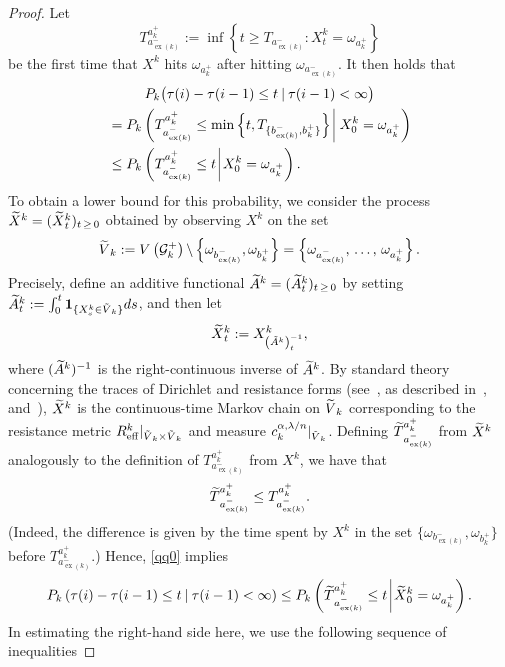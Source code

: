 \documentclass[AHL,Unicode,longabstracts,published]{cedram}
\newcommand{\clG}{\mathcal{G}}
\newcommand{\bfun}{\mathbf{1}}
\newcommand{\eff}{\mathrm{eff}}
\newcommand{\Pk}{{P_k}}
\newcommand\ex{\operatorname{ex}}
\newcommand{\aat}[1]{a_{\ex(#1)}^-}
\newcommand{\bt}[1]{b_{\ex(#1)}^-}
\let\oldtilde\tilde
\renewcommand*{\tilde}[1]{\mathchoice{\widetilde{#1}}{\widetilde{#1}}{\oldtilde{#1}}{\oldtilde{#1}}}
\begin{document}
\begin{proof}
Let
\[
T_{\aat{k}}^{a_k^+}:=\inf\left\{t\geq T_{\aat{k}}:X^k_t=\omega_{a_k^+}\right\}
\]
be the first time that $X^k$ hits $\omega_{a_k^+}$ after hitting $\omega_{\aat{k}}$. It then holds that
\begin{multline}\label{qq0}
{\Pk\big(\tau(i)-\tau(i-1)\leq t\:|\:\tau(i-1)<\infty\big)}
\\
\begin{aligned}
&=\Pk\left(T_{\aat{k}}^{a_k^+}\leq \min\left\{t,T_{\{\bt{k},b_k^+\}}\right\}\:\vline\:X^k_0=\omega_{a_k^+}\right)\\
&\leq \Pk\left(T_{\aat{k}}^{a_k^+}\leq t\:\vline\:X^k_0=\omega_{a_k^+}\right).
\end{aligned}
\end{multline}
To obtain a lower bound for this probability, we consider the process $\tilde{X}^k=(\tilde{X}^k_t)_{t\,\geq\,0}$ obtained by observing $X^k$ on the set
\[
\tilde{V}_k:=V\left(\clG_k^+\right)\backslash\left\{\omega_{\bt{k}},\omega_{b_k^+}\right\}=\left\{\omega_{\aat{k}},\,\dots,\,\omega_{a_k^+}\right\}.
\]
Precisely, define an additive functional $\tilde{A}^k=(\tilde{A}^k_t)_{t\,\geq\,0}$ by setting $\tilde{A}^k_t:=\int_0^t\bfun_{
\{X^k_s\in\tilde{V}_k\}}ds$, and then let
\begin{equation}\label{xtildekdef}
\tilde{X}^k_t:=X^k_{\left(\tilde{A}^k\right)^{-1}_t},
\end{equation}
where $(\tilde{A}^k)^{-1}$ is the right-continuous inverse of $\tilde{A}^k$. By standard theory concerning the traces of Dirichlet and resistance forms (see~\cite[Theorem~6.2.1]{FOT}, as described in~\cite[Theorem~4.17]{Barlow}, and~\cite[Theorem~8.4]{Kigami}), $\tilde{X}^k$ is the continuous-time Markov chain on $\tilde{V}_k$ corresponding to the resistance metric $R^k_{\eff}|_{\tilde{V}_k\times \tilde{V}_k}$ and measure $c_k^{\alpha,\lambda/n}|_{\tilde{V}_k}$. Defining $\tilde{T}_{\aat{k}}^{a_k^+}$ from $\tilde{X}^k$ analogously to the definition of $T_{\aat{k}}^{a_k^+}$ from $X^k$, we have that
\[
\tilde{T}_{\aat{k}}^{a_k^+}\leq {T}_{\aat{k}}^{a_k^+}.
\]
(Indeed, the difference is given by the time spent by $X^k$ in the set $\{\omega_{\bt{k}},\omega_{b_k^+}\}$ before {\small${T}_{\aat{k}}^{a_k^+}$.)} Hence, \eqref{qq0} implies
\begin{equation}\label{qq01}
\Pk\left(\tau(i)-\tau(i-1)\leq t\:|\:\tau(i-1)<\infty\right)
\leq \Pk\left(\tilde{T}_{\aat{k}}^{a_k^+}\leq t\:\vline\:\tilde{X}^k_0=\omega_{a_k^+}\right).
\end{equation}
In estimating the right-hand side here, we use the following sequence of inequalities

\end{proof}
\end{document}
